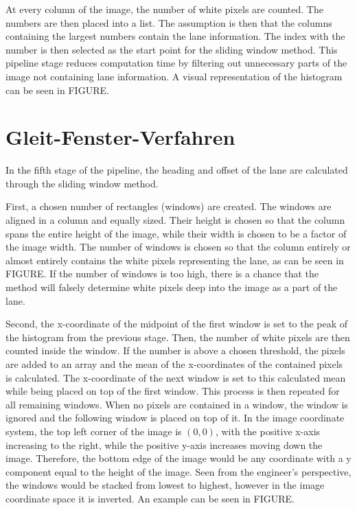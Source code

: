 \documentclass[arbeit=studie,oneside,BCOR=12mm]{ArbeitRST}
\begin{document}
At every column of the image, the number of white pixels are counted. 
The numbers are then placed into a list. The assumption is then that the 
columns containing the largest numbers contain the lane information. The 
index with the number is then selected as the start point for the sliding 
window method. This pipeline stage reduces computation time by filtering out 
unnecessary parts of the image not containing lane information. A visual 
representation of the histogram can be seen in FIGURE.

\section{Gleit-Fenster-Verfahren}

In the fifth stage of the pipeline, the heading and offset of the lane are
calculated through the sliding window method.

First, a chosen number of rectangles (windows) are created. The windows are
aligned in a column and equally sized. Their height is chosen so that the
column spans the entire height of the image, while their width is chosen to be
a factor of the image width. The number of windows is chosen so that the column
entirely or almost entirely  contains the white pixels representing the lane,
as can be seen in FIGURE. If the number of windows is too high, there is a
chance that the method will falsely determine white pixels deep into the image
as a part of the lane. 

Second, the x-coordinate of the midpoint of the first window is set to the peak
of the histogram from the previous stage. Then, the number of white pixels are
then counted inside the window. If the number is above a chosen threshold, the
pixels are added to an array and the mean of the x-coordinates of the contained
pixels is calculated. The x-coordinate of the next window is set to this
calculated mean while being placed on top of the first window. This process is
then repeated for all remaining windows. When no pixels are contained in a
window, the window is ignored and the following window is placed on top of it.
In the image coordinate system, the top left corner of the image is $(0, 0)$,
with the positive x-axis increasing to the right, while the positive y-axis
increases moving down the image. Therefore, the bottom edge of the image would
be any coordinate with a y component equal to the height of the image. Seen
from the engineer's perspective, the windows would be stacked from lowest to
highest, however in the image coordinate space it is inverted. An example can
be seen in FIGURE.
\end{document}
